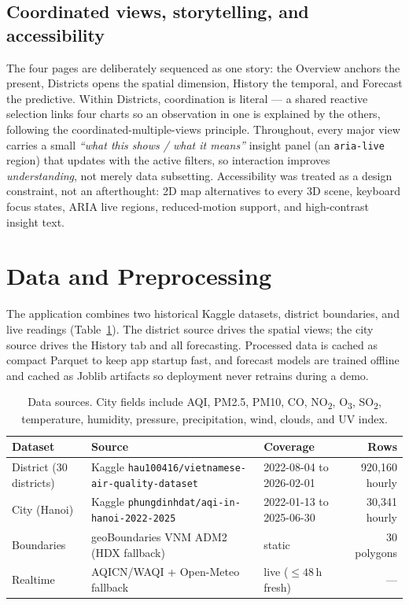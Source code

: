 \documentclass[a4paper]{article}
\begin{document}
\subsection{Coordinated views, storytelling, and accessibility}
The four pages are deliberately sequenced as one story: the Overview anchors the present, Districts opens
the spatial dimension, History the temporal, and Forecast the predictive. Within Districts, coordination
is literal --- a shared reactive selection links four charts so an observation in one is explained by the
others, following the coordinated-multiple-views principle. Throughout, every major view carries a small
\emph{``what this shows / what it means''} insight panel (an \texttt{aria-live} region) that updates with
the active filters, so interaction improves \emph{understanding}, not merely data subsetting. Accessibility
was treated as a design constraint, not an afterthought: 2D map alternatives to every 3D scene, keyboard
focus states, ARIA live regions, reduced-motion support, and high-contrast insight text.

\section{Data and Preprocessing}
The application combines two historical Kaggle datasets, district boundaries, and live readings
(Table~\ref{tab:data}). The district source drives the spatial views; the city source drives the History
tab and all forecasting. Processed data is cached as compact Parquet to keep app startup fast, and forecast
models are trained offline and cached as Joblib artifacts so deployment never retrains during a demo.

\begin{table}[h]
\centering
\small
\begin{tabular}{@{}lllr@{}}
\toprule
Dataset & Source & Coverage & Rows \\
\midrule
District (30 districts) & Kaggle \texttt{hau100416/vietnamese-air-quality-dataset} & 2022-08-04 to 2026-02-01 & 920{,}160 hourly \\
City (Hanoi) & Kaggle \texttt{phungdinhdat/aqi-in-hanoi-2022-2025} & 2022-01-13 to 2025-06-30 & 30{,}341 hourly \\
Boundaries & geoBoundaries VNM ADM2 (HDX fallback) & static & 30 polygons \\
Realtime & AQICN/WAQI + Open-Meteo fallback & live ($\le 48$\,h fresh) & --- \\
\bottomrule
\end{tabular}
\caption{Data sources. City fields include AQI, PM2.5, PM10, CO, NO\textsubscript{2}, O\textsubscript{3},
SO\textsubscript{2}, temperature, humidity, pressure, precipitation, wind, clouds, and UV index.}
\label{tab:data}
\end{table}
\end{document}
